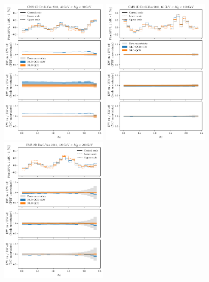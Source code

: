 \begin{figure}[!p]
    \centering
    \includegraphics[width=0.46\textwidth]{figures/pineappl_CMSDY2D11_bin3}%
    \includegraphics[width=0.46\textwidth]{figures/pineappl_CMSDY2D11_bin4}\\
    \includegraphics[width=0.46\textwidth]{figures/pineappl_CMSDY2D11_bin5}%

\end{figure}
